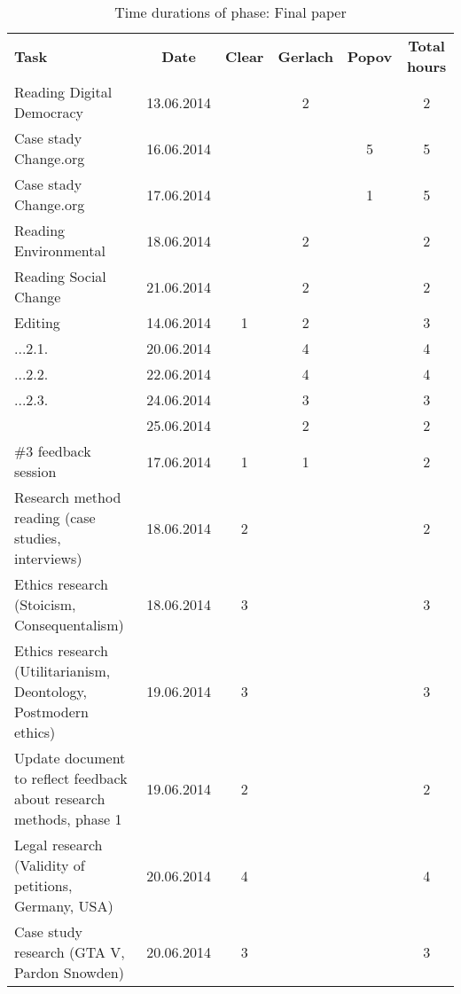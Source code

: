 \begin{table}[H]
\renewcommand{\arraystretch}{1.6}
\begin{threeparttable}

  \caption{Time durations of phase: Final paper}
  
  \begin{tabular}{p{3cm} c|c c c| c}
      \textbf{Task} & \textbf{Date}& \textbf{Clear} & \textbf{Gerlach} & \textbf{Popov} & \textbf{Total hours} \\
        Reading Digital Democracy
                        & 13.06.2014  &		 &	2		&		&  2 \\
        Case stady Change.org
        				& 16.06.2014  &		&			&	5	&	5 \\
        Case stady Change.org
        				& 17.06.2014  &		&			&	1	&	5 \\                     		Reading Environmental
        				& 18.06.2014  &		&	2		&		&	2 \\
        Reading Social Change
        				& 21.06.2014  &		&   2		&		&	2 \\

		Editing
        				& 14.06.2014  &	 1 &	2		&		&  3 \\
         ...2.1.
                        &  20.06.2014 &		&	4		&		&  4 \\
         ...2.2.
                        &  22.06.2014 &		&	4		&		&	4 \\
         ...2.3.
        				& 24.06.2014 &		&	3		&		&	3 \\
        				& 25.06.2014 &      &   2       &       &   2
\\
        \#3 feedback session
        				&	17.06.2014	& 1	& 	1			&		&	2 \\
Research method reading (case studies, interviews)
                        & 18.06.2014 & 		2 	&		 & 		& 	2 \\
Ethics research (Stoicism, Consequentalism) 
                        &  18.06.2014 & 	3 	& 		&		 & 3 \\
Ethics research (Utilitarianism, Deontology, Postmodern ethics)
                        & 19.06.2014 & 3 & & & 3 \\
Update document to reflect feedback about research methods, phase 1
                        & 19.06.2014 & 		2 	& 		& 		& 2 \\
Legal research (Validity of petitions, Germany, USA)
                        & 20.06.2014 & 4 		& 		& 		& 4 \\
Case study research (GTA V, Pardon Snowden)
                        & 20.06.2014 & 3 & & & 3 \\

\end{tabular}
\end{threeparttable}
\end{table}

